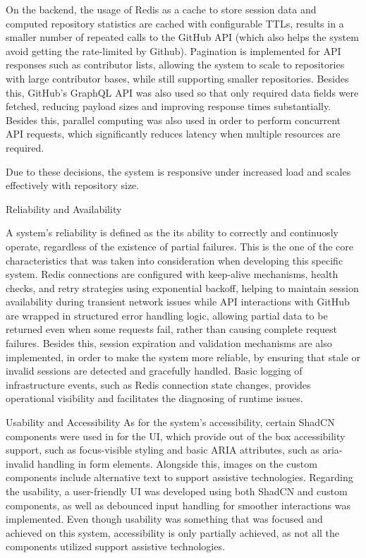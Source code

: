 \documentclass[12pt,reqno, twoside]{amsbook}
\makeatletter
\def\subsubsection{\@startsection{subsubsection}{3}%
      \z@{.5\linespacing\@plus.7\linespacing}{.25\linespacing}%
      {\normalfont\bfseries\flushleft}}
\theoremstyle{plain}
\numberwithin{equation}{chapter}
\numberwithin{section}{chapter}
\makeatother
\begin{document}
On the backend, the usage of Redis as a cache to store session data and computed repository statistics 
are cached with configurable TTLs, results in a smaller number of repeated calls to the GitHub API (which also helps the system avoid 
getting the rate-limited by Github). Pagination is implemented for API responses such as contributor lists, allowing the system to 
scale to repositories with large contributor bases, while still supporting smaller repositories. Besides this, GitHub's GraphQL API 
was also used so that only required data fields were fetched, reducing payload sizes and improving response times substantially. 
Besides this, parallel computing was also used in order to perform concurrent API requests, which significantly reduces latency when 
multiple resources are required.

Due to these decisions, the system is responsive under increased load and scales effectively with repository size.

\subsubsection{Reliability and Availability}

A system's reliability is defined as the its ability to correctly and continuosly operate, regardless of the existence of partial 
failures. This is the one of the core characteristics that was taken into consideration when developing this specific system. 
Redis connections are configured with keep-alive mechanisms, health checks, and retry strategies using exponential backoff, helping 
to maintain session availability during transient network issues while API interactions with GitHub are wrapped in structured error 
handling logic, allowing partial data to be returned even when some requests fail, rather than causing complete request failures.
Besides this, session expiration and validation mechanisms are also implemented, in order to make the system more reliable, by 
ensuring that stale or invalid sessions are detected and gracefully handled. Basic logging of infrastructure events, such as Redis 
connection state changes, provides operational visibility and facilitates the diagnosing of runtime issues.

\subsubsection{Usability and Accessibility}
As for the system's accessibility, certain ShadCN components were used in for the UI, which provide out of the box 
accessibility support, such as focus-visible styling and basic ARIA attributes, such as aria-invalid handling in form elements. 
Alongside this, images on the custom components include alternative text to support assistive technologies.
Regarding the usability, a user-friendly UI was developed using both ShadCN and custom components, as well as debounced input 
handling for smoother interactions was implemented. Even though usability was something that was focused and achieved on this system, 
accessibility is only partially achieved, as not all the components utilized support assistive technologies.
\end{document}
